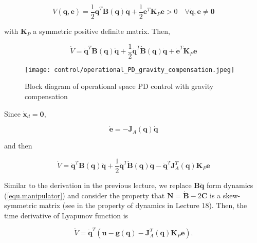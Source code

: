 \documentclass[10pt]{article}
\begin{document}
$$
V(\dot{\boldsymbol{q}}, {\boldsymbol{e}})=\frac{1}{2} \dot{\boldsymbol{q}}^{T} \boldsymbol{B}(\boldsymbol{q}) \dot{\boldsymbol{q}}+\frac{1}{2} {\boldsymbol{e}}^{T} \boldsymbol{K}_{P} {\boldsymbol{e}}>0 \quad \forall \dot{\boldsymbol{q}}, {\boldsymbol{e}} \neq \mathbf{0}
$$

with $\boldsymbol{K}_{P}$ a symmetric positive definite matrix. Then,

$$
\dot{V}=\dot{\boldsymbol{q}}^{T} \boldsymbol{B}(\boldsymbol{q}) \ddot{\boldsymbol{q}}+\frac{1}{2} \dot{\boldsymbol{q}}^{T} \dot{\boldsymbol{B}}(\boldsymbol{q}) \dot{\boldsymbol{q}}+\dot{\boldsymbol{e}}^{T} \boldsymbol{K}_{P} {\boldsymbol{e}}
$$

\begin{figure}[H]
    \centering
    \texttt{[image: control/operational\_PD\_gravity\_compensation.jpeg]}
    \caption{Block diagram of operational space PD control with gravity compensation}
    \label{fig:3}
\end{figure}


Since $\dot{\boldsymbol{x}}_{d}=\mathbf{0}$, 

$$
\dot{{\boldsymbol{e}}}=-\boldsymbol{J}_{A}(\boldsymbol{q}) \dot{\boldsymbol{q}}
$$

and then

$$
\dot{V}=\dot{\boldsymbol{q}}^{T} \boldsymbol{B}(\boldsymbol{q}) \ddot{\boldsymbol{q}}+\frac{1}{2} \dot{\boldsymbol{q}}^{T} \dot{\boldsymbol{B}}(\boldsymbol{q}) \dot{\boldsymbol{q}}-\dot{\boldsymbol{q}}^{T} \boldsymbol{J}_{A}^{T}(\boldsymbol{q}) \boldsymbol{K}_{P} {\boldsymbol{e}}
$$

Similar to the derivation in the previous lecture, we replace $\boldsymbol{B}\ddot{\boldsymbol{q}}$ form dynamics (\ref{equ.manipulator}) and consider the property that $\boldsymbol{N}=\dot{\boldsymbol{B}}-2 \boldsymbol{C}$ is a skew-symmetric matrix (see in the property of dynamics in Lecture 18). Then, the time derivative of Lyapunov function is 

$$
\dot{V}=\dot{\boldsymbol{q}}^{T}\left(\boldsymbol{u}-\boldsymbol{g}(\boldsymbol{q})-\boldsymbol{J}_{A}^{T}(\boldsymbol{q}) \boldsymbol{K}_{P} {\boldsymbol{e}}\right) .
$$
\end{document}
